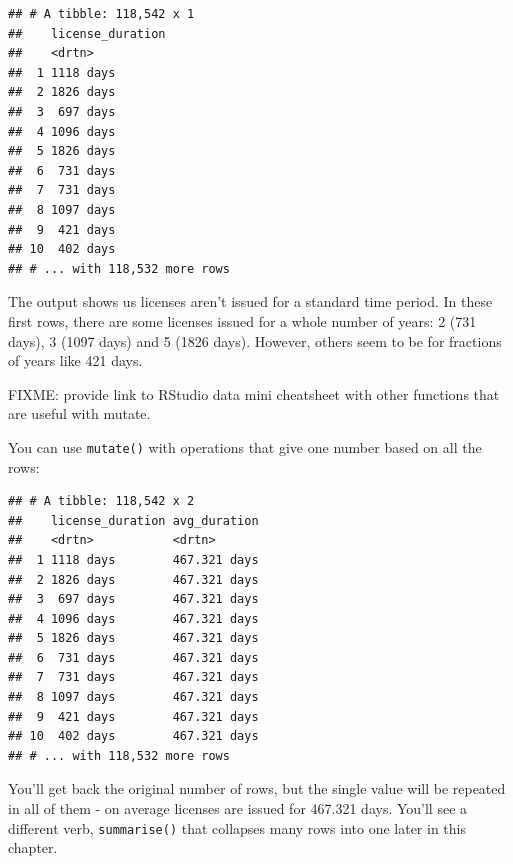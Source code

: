 \documentclass[]{Nemilov}
\newenvironment{Shaded}{\begin{snugshade}}{\end{snugshade}}
\newcommand{\DataTypeTok}[1]{\textcolor[rgb]{0.13,0.29,0.53}{#1}}
\newcommand{\KeywordTok}[1]{\textcolor[rgb]{0.13,0.29,0.53}{\textbf{#1}}}
\newcommand{\NormalTok}[1]{#1}
\newcommand{\OperatorTok}[1]{\textcolor[rgb]{0.81,0.36,0.00}{\textbf{#1}}}
\newcommand{\StringTok}[1]{\textcolor[rgb]{0.31,0.60,0.02}{#1}}
\begin{document}
\begin{verbatim}
## # A tibble: 118,542 x 1
##    license_duration
##    <drtn>          
##  1 1118 days       
##  2 1826 days       
##  3  697 days       
##  4 1096 days       
##  5 1826 days       
##  6  731 days       
##  7  731 days       
##  8 1097 days       
##  9  421 days       
## 10  402 days       
## # ... with 118,532 more rows
\end{verbatim}

The output shows us licenses aren't issued for a standard time period. In these first rows, there are some licenses issued for a whole number of years: 2 (731 days), 3 (1097 days) and 5 (1826 days). However, others seem to be for fractions of years like 421 days.

FIXME: provide link to RStudio data mini cheatsheet with other functions that are useful with mutate.

You can use \texttt{mutate()} with operations that give one number based on all the rows:

\begin{Shaded}
\end{Shaded}

\begin{verbatim}
## # A tibble: 118,542 x 2
##    license_duration avg_duration
##    <drtn>           <drtn>      
##  1 1118 days        467.321 days
##  2 1826 days        467.321 days
##  3  697 days        467.321 days
##  4 1096 days        467.321 days
##  5 1826 days        467.321 days
##  6  731 days        467.321 days
##  7  731 days        467.321 days
##  8 1097 days        467.321 days
##  9  421 days        467.321 days
## 10  402 days        467.321 days
## # ... with 118,532 more rows
\end{verbatim}

You'll get back the original number of rows, but the single value will be repeated in all of them - on average licenses are issued for 467.321 days. You'll see a different verb, \texttt{summarise()} that collapses many rows into one later in this chapter.
\end{document}
